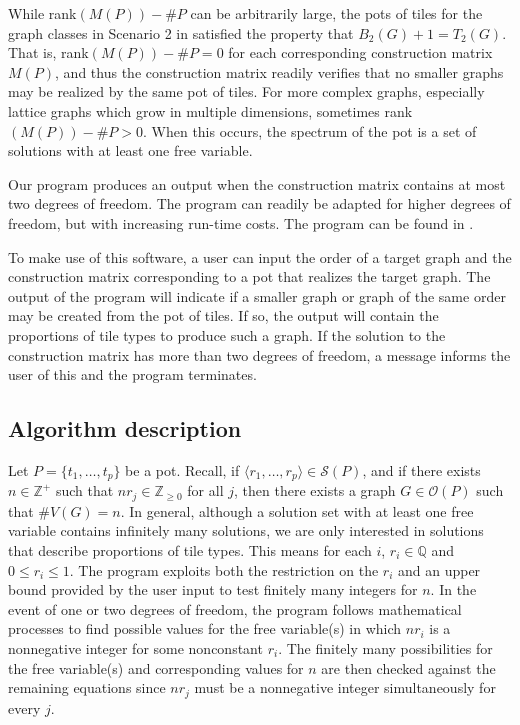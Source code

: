 \documentclass{elsarticle}
\theoremstyle{definition}
\theoremstyle{remark}
\theoremstyle{plain}
\theoremstyle{plain}
\begin{document}
While rank$(M(P))-\#P$ can be arbitrarily large, the pots of tiles for the graph classes in Scenario 2 in \cite{ellis2014minimal} satisfied the property that $B_2(G) + 1 = T_2(G)$. That is, rank$(M(P)) - \# P = 0$ for each corresponding construction matrix $M(P)$, and thus the construction matrix readily verifies that no smaller graphs may be realized by the same pot of tiles.
For more complex graphs, especially lattice graphs which grow in multiple dimensions,  sometimes  rank$(M(P)) - \#P > 0$. When this occurs, the spectrum of the pot is a set of solutions with at least one free variable.  

Our program produces an output when the construction matrix contains at most two degrees of freedom. The program can readily be adapted for higher degrees of freedom, but with increasing run-time costs.  The program can be found in \cite{MapleProgram}. 

To make use of this software, a user can input the order of a target graph and the construction matrix corresponding to a pot that realizes the target graph. The output of the program will indicate if a smaller graph or graph of the same order may be created from the pot of tiles. If so, the output will contain the proportions of tile types to produce such a graph. If the solution to the construction matrix has more than two degrees of freedom, a message informs the user of this and the program terminates. 


\subsection{Algorithm description}
Let $P = \{t_1, \ldots, t_p\}$ be a pot.
Recall, if $\langle r_1, \ldots, r_p \rangle \in \mathcal{S}(P)$, and if there exists $n \in \mathbb{Z}^+$ such that $nr_j \in \mathbb{Z}_{\geq 0}$ for all $j$, then there exists a graph $G \in \mathcal{O}(P)$ such that $\#V(G)=n$. In general, although a solution set with at least one free variable contains infinitely many solutions, we are only interested in solutions that describe proportions of tile types. This means for each $i$, $r_i \in \mathbb{Q}$ and $0 \leq r_i \leq 1$.  The program exploits both the restriction on the $r_i$ and an upper bound provided by the user input to test finitely many integers for $n$. In the event of one or two degrees of freedom, the program follows  mathematical processes to find possible values for the free variable(s) in which $nr_i$ is a nonnegative integer for some nonconstant $r_i$. The finitely many possibilities for the free variable(s) and corresponding values for $n$ are then checked against the remaining equations since $nr_j$ must be a nonnegative integer simultaneously for every $j$.  
\end{document}
